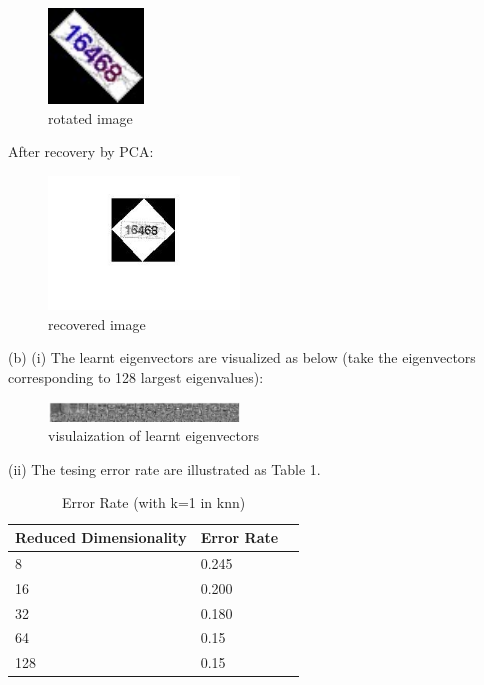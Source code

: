 \documentclass[11pt]{article} %
\begin{document}
\begin{figure}[h]
\centering
\includegraphics[width=1in]{3.jpg}  %
\caption{rotated image}
\label{fig1}
\end{figure}

After recovery by PCA:

\begin{figure}[h]
\centering
\includegraphics[width=2in]{recover3.jpg}  %
\caption{recovered image}
\label{fig1}
\end{figure}

(b)
(i)  The learnt eigenvectors are visualized as below (take the eigenvectors corresponding to 128 largest eigenvalues):

\begin{figure}[h]
\centering
\includegraphics[width=2in]{eigenface.jpg}  %
\caption{visulaization of learnt eigenvectors}
\label{fig1}
\end{figure}


(ii) The tesing error rate are illustrated as Table 1.

\begin{table}  
\centering
\caption{Error Rate (with k=1 in knn)}  
\begin{tabular*}{12cm}{lll}  
\hline  
Reduced Dimensionality & Error Rate \\  
\hline  
8  & 0.245  \\  
16  & 0.200  \\  
32 & 0.180 \\
64 & 0.15 \\
128 & 0.15 \\
\hline  
\end{tabular*}  
\end{table}  
\end{document}
